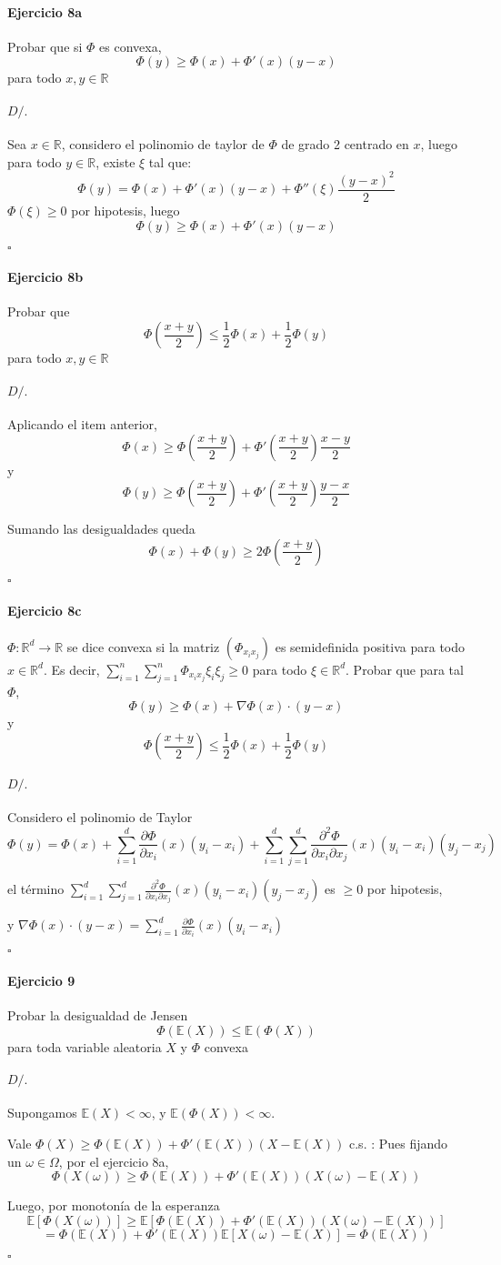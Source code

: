 \documentclass[10pt,a4paper]{article}
\newcommand{\R}{ \mathbb R }
\newcommand{\E}{ \mathbb E }
\newenvironment{ejercicio}[3]
{
	\paragraph{Ejercicio #1}
	#2
	\paragraph{$D/.$}
	#3
	$\square$
}{
}
\begin{document}
\begin{ejercicio}{8a}{
	Probar que si $\Phi$ es convexa,
	$$
		\Phi(y) \ge \Phi(x) + \Phi'(x)(y-x)
	$$
	para todo $ x,y \in \R $
}{
	Sea $x \in \R$, considero el polinomio de taylor de $\Phi$ de grado 2 centrado en $x$, luego para todo $y \in \R$, existe $\xi$ tal que:
	$$
		\Phi(y) = \Phi(x) + \Phi'(x) (y-x) + \Phi''(\xi) \frac{(y-x)^2}{2}
	$$
	$\Phi(\xi) \ge 0$ por hipotesis, luego
	$$
		\Phi(y) \ge \Phi(x) + \Phi'(x) (y-x)
	$$
}
\end{ejercicio}

\begin{ejercicio}{8b}{
	Probar que 
	$$
		\Phi(\frac{x+y}{2}) \le \frac{1}{2}\Phi(x) + \frac{1}{2}\Phi(y)
	$$
	para todo $ x,y \in \R $
}{
	Aplicando el item anterior,
	$$
		\Phi(x) \ge \Phi(\frac{x+y}{2}) + \Phi'(\frac{x+y}{2}) \frac{x-y}{2}
	$$
	y
	$$
		\Phi(y) \ge \Phi(\frac{x+y}{2}) + \Phi'(\frac{x+y}{2}) \frac{y-x}{2}
	$$

	Sumando las desigualdades queda
	$$
		\Phi(x) + \Phi(y) \ge 2 \Phi(\frac{x+y}{2})
	$$
}
\end{ejercicio}

\begin{ejercicio}{8c}{
	$\Phi: \R^d \to \R$	se dice convexa si la matriz $(\Phi_{x_i x_j})$ es semidefinida positiva para todo $x \in \R^d$.
	Es decir, $\sum_{i=1}^n \sum_{j=1}^n \Phi_{x_i x_j} \xi_i \xi_j \ge 0$ para todo $\xi \in \R^d$.
	Probar que para tal $\Phi$,
	$$
		\Phi(y) \ge \Phi(x) + \nabla\Phi(x) \cdot (y-x)
	$$
	y
	$$
		\Phi(\frac{x+y}{2}) \le \frac{1}{2}\Phi(x) + \frac{1}{2}\Phi(y)
	$$
}{
	Considero el polinomio de Taylor
	$$
		\Phi(y) = \Phi(x)
		+ \sum_{i=1}^d \frac {\partial \Phi}{\partial x_i}(x) (y_i - x_i)
		+ \sum_{i=1}^d \sum_{j=1}^d \frac{\partial^2 \Phi}{\partial x_i \partial x_j}(x) (y_i - x_i) (y_j - x_j)
	$$

	el t\'ermino $\sum_{i=1}^d \sum_{j=1}^d \frac{\partial^2 \Phi}{\partial x_i \partial x_j}(x) (y_i - x_i) (y_j - x_j)$ es $\ge 0$ por hipotesis,

	y $\nabla\Phi(x) \cdot (y-x) = \sum_{i=1}^d \frac {\partial \Phi}{\partial x_i}(x) (y_i - x_i)$
}
\end{ejercicio}

\begin{ejercicio}{9}{
	Probar la desigualdad de Jensen
	$$
		\Phi(\E(X)) \le \E(\Phi(X))
	$$
	para toda variable aleatoria $X$ y $\Phi$ convexa
}{
	Supongamos $\E(X) < \infty$, y $\E (\Phi(X)) < \infty$.

		Vale $ \Phi(X) \ge \Phi(\E(X)) + \Phi'(\E(X))(X - \E(X)) $ c.s. :
		Pues fijando un $\omega \in \Omega$, por el ejercicio 8a,
		$$
			\Phi(X(\omega))
			\ge
			\Phi(\E(X)) + \Phi'(\E(X)) (X(\omega) - \E(X))
		$$

		Luego, por monotonía de la esperanza
		$$
			\E[\Phi(X(\omega))]
			\ge
			\E[\Phi(\E(X)) + \Phi'(\E(X)) (X(\omega) - \E(X))]
			$$$$
			=
			\Phi(\E(X)) + \Phi'(\E(X)) \E[X(\omega) - \E(X)]
			=
			\Phi(\E(X))
		$$
}\end{ejercicio}
\end{document}
